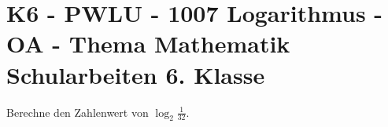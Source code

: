 \section{K6 - PWLU - 1007 Logarithmus - OA - Thema Mathematik Schularbeiten 6. Klasse}

\begin{beispiel}[K6 - PWLU]{1} %
			Berechne den Zahlenwert von $\log_2\frac{1}{32}$.\leer
			
							\end{beispiel}